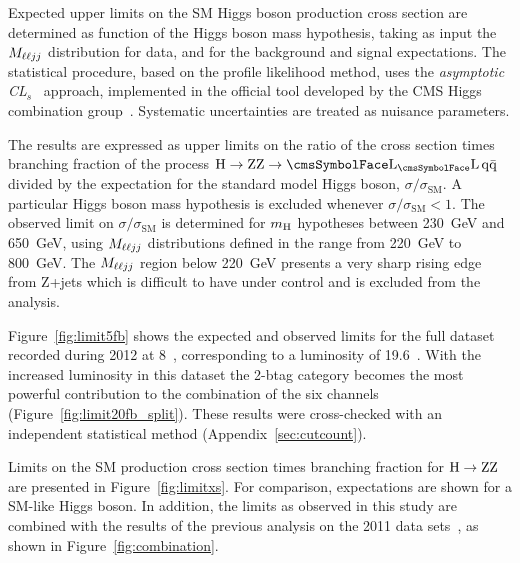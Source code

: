 Expected upper limits on the SM Higgs boson production cross section are determined as function of the Higgs boson mass hypothesis, taking as input the $M_{\ell\ell jj}$ distribution for data, and for the background and signal expectations. The statistical procedure, based on the profile likelihood method, uses the \textit{asymptotic CL$_s$}~\cite{AsymptCLs} approach, implemented in the official tool developed by the CMS Higgs combination group~\cite{HiggsLimitTWiki}. Systematic uncertainties are treated as nuisance parameters.

The results are expressed as upper limits on the ratio of the cross section times branching fraction of the process $\Htollqq\ $ divided by the expectation for the standard model Higgs boson, $\sigma / \sigma_\mathrm{SM}$. A particular Higgs boson mass hypothesis is excluded whenever \mbox{$\sigma / \sigma_\mathrm{SM} < 1$}. The observed limit on $\sigma / \sigma_\mathrm{SM}$ is determined for $m_{\mathrm{H}}$ hypotheses between 230~GeV and 650~GeV, using $M_{\ell\ell jj}$ distributions defined in the range from 220~GeV to 800~GeV. The $M_{\ell\ell jj}$ region below 220~GeV presents a very sharp rising edge from Z+jets which is difficult to have under control and is excluded from the analysis.

Figure~\ref{fig:limit5fb} shows the expected and observed limits for the full dataset recorded during 2012 at 8~\TeV{}, corresponding to a luminosity of 19.6~\fbinv{}. With the increased luminosity in this dataset the 2-btag category becomes the most powerful contribution to the combination of the six channels (Figure~\ref{fig:limit20fb_split}). These results were cross-checked with an independent statistical method (Appendix~\ref{sec:cutcount}).

Limits on the SM production cross section times branching fraction for $\mathrm{\mathrm{H}\rightarrow\mathrm{Z}\mathrm{Z}}$ are presented in Figure~\ref{fig:limitxs}. For comparison, expectations are shown for a SM-like Higgs boson. In addition, the limits as observed in this study are combined with the results of the previous analysis on the 2011 data sets~\cite{HIG-11-027}, as shown in Figure~\ref{fig:combination}.


